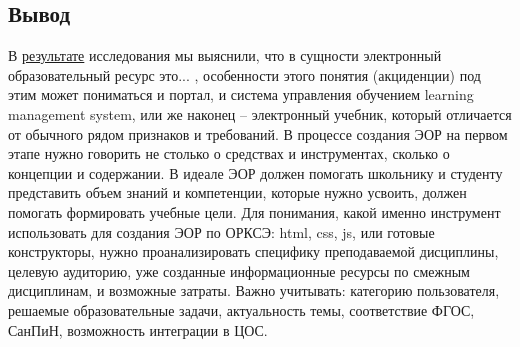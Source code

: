 \newpage
\subsection{Вывод}
В \hyperref[task1]{результате} исследования мы выяснили, что в сущности электронный образовательный ресурс это... , особенности этого понятия (акциденции) под этим может пониматься и портал, и система управления обучением learning management system, или же наконец -- электронный учебник, который отличается от обычного рядом признаков и требований. 
В процессе создания ЭОР на первом этапе нужно говорить не столько о средствах и инструментах, сколько о концепции и содержании.
В идеале ЭОР должен помогать школьнику и студенту представить объем знаний и компетенции, которые нужно усвоить, должен помогать формировать учебные цели.
Для понимания, какой именно инструмент использовать для создания ЭОР по ОРКСЭ: html, css, js, или готовые конструкторы, нужно проанализировать специфику преподаваемой дисциплины, целевую аудиторию, уже созданные информационные ресурсы по смежным дисциплинам, и возможные затраты.
Важно учитывать: категорию пользователя, решаемые образовательные задачи, актуальность темы, соответствие ФГОС, СанПиН, возможность интеграции в ЦОС.
\listoftodos